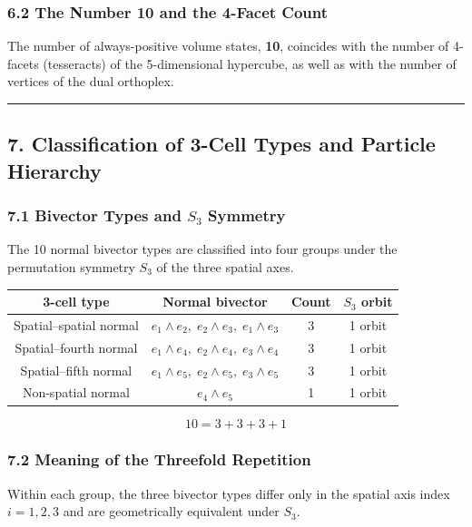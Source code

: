 \documentclass[a4paper,11pt]{article}
\newcounter{none}
\begin{document}
\subsubsection*{6.2 The Number 10 and the 4-Facet Count}

The number of always-positive volume states, \textbf{10}, coincides with the number of 4-facets (tesseracts) of the 5-dimensional hypercube, as well as with the number of vertices of the dual orthoplex.

\begin{center}\rule{0.5\linewidth}{0.5pt}\end{center}

\subsection*{7. Classification of 3-Cell Types and Particle Hierarchy}

\subsubsection*{7.1 Bivector Types and $S_3$ Symmetry}

The 10 normal bivector types are classified into four groups under the permutation symmetry $S_3$ of the three spatial axes.

{\def\LTcaptype{none}
\begin{longtable}[]{@{}cccc@{}}
\toprule
3-cell type & Normal bivector & Count & $S_3$ orbit \\
\midrule
\endhead
\bottomrule
\endlastfoot
Spatial--spatial normal & $e_1 \wedge e_2, \; e_2 \wedge e_3, \; e_1 \wedge e_3$ & 3 & 1 orbit \\
Spatial--fourth normal & $e_1 \wedge e_4, \; e_2 \wedge e_4, \; e_3 \wedge e_4$ & 3 & 1 orbit \\
Spatial--fifth normal & $e_1 \wedge e_5, \; e_2 \wedge e_5, \; e_3 \wedge e_5$ & 3 & 1 orbit \\
Non-spatial normal & $e_4 \wedge e_5$ & 1 & 1 orbit \\
\end{longtable}
}

\[10 = 3 + 3 + 3 + 1\]

\subsubsection*{7.2 Meaning of the Threefold Repetition}

Within each group, the three bivector types differ only in the spatial axis index $i = 1, 2, 3$ and are geometrically equivalent under $S_3$.
\end{document}

